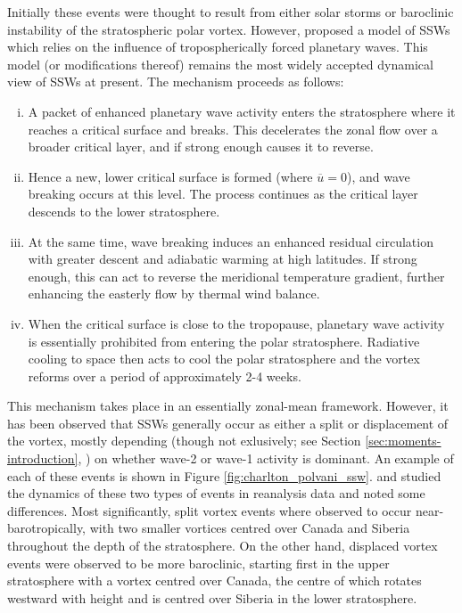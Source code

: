 Initially these events were thought to result from either solar storms or
baroclinic instability of the stratospheric polar vortex. However,
\citet{Matsuno1970, Matsuno1971} proposed a model of SSWs which relies on the
influence of tropospherically forced planetary waves. This model (or
modifications thereof) remains the most widely accepted dynamical view of SSWs
at present. The mechanism proceeds as follows:
\begin{enumerate}[i.]
\item A packet of enhanced planetary wave activity enters the stratosphere where
  it reaches a critical surface and breaks. This decelerates the zonal flow over
  a broader critical layer, and if strong enough causes it to reverse.
\item Hence a new, lower critical surface is formed (where $\overline{u}=0$),
  and wave breaking occurs at this level. The process continues as the critical
  layer descends to the lower stratosphere. 
\item At the same time, wave breaking induces an enhanced residual circulation
  with greater descent and adiabatic warming at high latitudes. If strong
  enough, this can act to reverse the meridional temperature gradient, further
  enhancing the easterly flow by thermal wind balance. 
\item When the critical surface is close to the tropopause, planetary wave
  activity is essentially prohibited from entering the polar
  stratosphere. Radiative cooling to space then acts to cool the polar
  stratosphere and the vortex reforms over a period of approximately 2-4 weeks.
\end{enumerate}

This mechanism takes place in an essentially zonal-mean framework. However, it
has been observed that SSWs generally occur as either a split or displacement of
the vortex, mostly depending (though not exlusively; see Section
\ref{sec:moments-introduction}, \citep{Waugh1997}) on whether wave-2 or wave-1
activity is dominant. An example of each of these events is shown in Figure
\ref{fig:charlton_polvani_ssw}. \citet{Charlton2007a} and \citet{Matthewman2009}
studied the dynamics of these two types of events in reanalysis data and noted
some differences. Most significantly, split vortex events where observed to
occur near-barotropically, with two smaller vortices centred over Canada and
Siberia throughout the depth of the stratosphere. On the other hand, displaced
vortex events were observed to be more baroclinic, starting first in the upper
stratosphere with a vortex centred over Canada, the centre of which rotates
westward with height and is centred over Siberia in the lower stratosphere.



